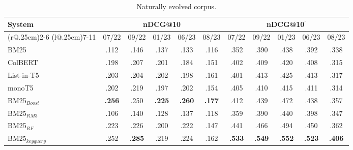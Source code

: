 \begin{table}[t]
\small
\centering
\renewcommand{\tabcolsep}{3.2pt}
\caption{Naturally evolved corpus.}
\label{tab:table-results}

\begin{tabular}{@{}l@{}cccccccccc@{}}
    \toprule
    \bfseries System & \multicolumn{5}{c}{\bfseries nDCG@10} & \multicolumn{5}{c}{\bfseries nDCG@10$^{'}$}\\
    \cmidrule(r@{.25em}){2-6}
    \cmidrule(l@{.25em}){7-11}
    
    & 07/22 & 09/22 & 01/23 & 06/23 & 08/23 & 07/22 & 09/22 & 01/23 & 06/23 & 08/23\\
    
    \midrule

    BM25 & .112 & .146 & .137 & .133 & .116 & .352 & .390 & .438 & .392 & .338 \\
    ColBERT & .198 & .207 & .201 & .184 & .151 & .402 & .409 & .420 & .408 & .315 \\
    List-in-T5 & .203 & .204 & .202 & .198 & .161 & .401 & .413 & .425 & .413 & .317 \\
    monoT5 & .202 & .219 & .197 & .202 & .154 & .405 & .410 & .415 & .411 & .314 \\
    
    \midrule
    
    BM25$_{Boost}$ & \bfseries .256 & .250 & \bfseries .225 & \bfseries .260 & \bfseries .177 & .412 & .439 & .472 & .438 & .357 \\
    BM25$_{RM3}$ & .106 & .140 & .128 & .137 & .118 & .359 & .390 & .440 & .398 & .347 \\
    BM25$_{RF}$ & .223 & .226 & .200 & .222 & .147 & .441 & .466 & .494 & .450 & .362 \\
    BM25$_{keyquery}$ & .252 & \bfseries .285 & .219 & .224 & .162 & \bfseries .533 & \bfseries .549 & \bfseries .552 & \bfseries .523 & \bfseries .406 \\

\bottomrule
\end{tabular}
\end{table}
